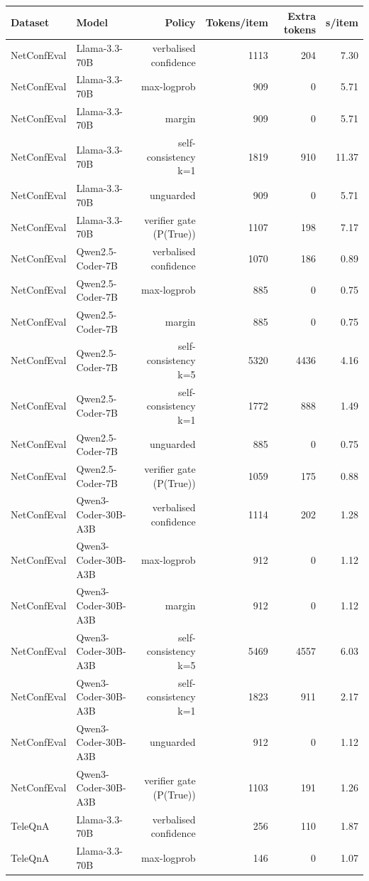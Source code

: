 \begin{tabular}{llrrrr}
\toprule
Dataset & Model & Policy & Tokens/item & Extra tokens & s/item \\
\midrule
NetConfEval & Llama-3.3-70B & verbalised confidence & 1113 & 204 & 7.30 \\
NetConfEval & Llama-3.3-70B & max-logprob & 909 & 0 & 5.71 \\
NetConfEval & Llama-3.3-70B & margin & 909 & 0 & 5.71 \\
NetConfEval & Llama-3.3-70B & self-consistency k=1 & 1819 & 910 & 11.37 \\
NetConfEval & Llama-3.3-70B & unguarded & 909 & 0 & 5.71 \\
NetConfEval & Llama-3.3-70B & verifier gate (P(True)) & 1107 & 198 & 7.17 \\
NetConfEval & Qwen2.5-Coder-7B & verbalised confidence & 1070 & 186 & 0.89 \\
NetConfEval & Qwen2.5-Coder-7B & max-logprob & 885 & 0 & 0.75 \\
NetConfEval & Qwen2.5-Coder-7B & margin & 885 & 0 & 0.75 \\
NetConfEval & Qwen2.5-Coder-7B & self-consistency k=5 & 5320 & 4436 & 4.16 \\
NetConfEval & Qwen2.5-Coder-7B & self-consistency k=1 & 1772 & 888 & 1.49 \\
NetConfEval & Qwen2.5-Coder-7B & unguarded & 885 & 0 & 0.75 \\
NetConfEval & Qwen2.5-Coder-7B & verifier gate (P(True)) & 1059 & 175 & 0.88 \\
NetConfEval & Qwen3-Coder-30B-A3B & verbalised confidence & 1114 & 202 & 1.28 \\
NetConfEval & Qwen3-Coder-30B-A3B & max-logprob & 912 & 0 & 1.12 \\
NetConfEval & Qwen3-Coder-30B-A3B & margin & 912 & 0 & 1.12 \\
NetConfEval & Qwen3-Coder-30B-A3B & self-consistency k=5 & 5469 & 4557 & 6.03 \\
NetConfEval & Qwen3-Coder-30B-A3B & self-consistency k=1 & 1823 & 911 & 2.17 \\
NetConfEval & Qwen3-Coder-30B-A3B & unguarded & 912 & 0 & 1.12 \\
NetConfEval & Qwen3-Coder-30B-A3B & verifier gate (P(True)) & 1103 & 191 & 1.26 \\
TeleQnA & Llama-3.3-70B & verbalised confidence & 256 & 110 & 1.87 \\
TeleQnA & Llama-3.3-70B & max-logprob & 146 & 0 & 1.07 \\

\end{tabular}
